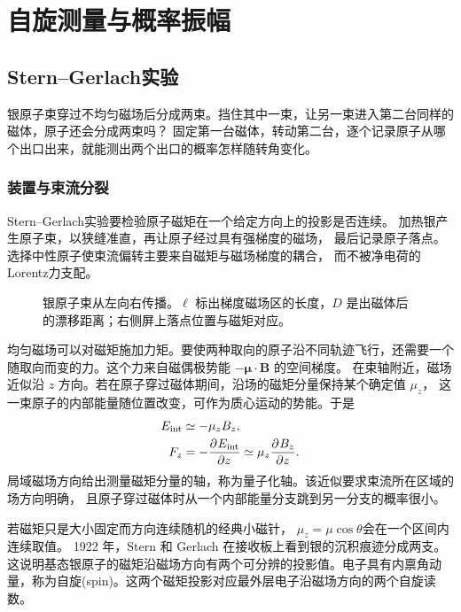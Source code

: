 \chapter{自旋测量与概率振幅}
\label{ch:spin}

\section{Stern--Gerlach实验}
银原子束穿过不均匀磁场后分成两束。挡住其中一束，让另一束进入第二台同样的磁体，原子还会分成两束吗？
固定第一台磁体，转动第二台，逐个记录原子从哪个出口出来，就能测出两个出口的概率怎样随转角变化。

\subsection{装置与束流分裂}
\label{ss:sg-apparatus}

Stern--Gerlach实验要检验原子磁矩在一个给定方向上的投影是否连续。
加热银产生原子束，以狭缝准直，再让原子经过具有强梯度的磁场，
最后记录原子落点。选择中性原子使束流偏转主要来自磁矩与磁场梯度的耦合，
而不被净电荷的Lorentz力支配\cite{sg}。

\begin{figure}[htbp]
    \centering
    \caption{银原子束从左向右传播。$\ell$ 标出梯度磁场区的长度，$D$ 是出磁体后的漂移距离；右侧屏上落点位置与磁矩对应。}
    \label{fig:sg-beam}
\end{figure}

均匀磁场可以对磁矩施加力矩。要使两种取向的原子沿不同轨迹飞行，还需要一个随取向而变的力。这个力来自磁偶极势能 $-\bm\mu \cdot \bm B$ 的空间梯度。
在束轴附近，磁场近似沿 $z$ 方向。若在原子穿过磁体期间，沿场的磁矩分量保持某个确定值 $\mu_z$，
这一束原子的内部能量随位置改变，可作为质心运动的势能。于是
\begin{subequations}
    \begin{align}
        E_{\mathrm{int}} &\simeq -\mu_z B_z,\\
        F_z &= -\frac{\partial^{}E_{\mathrm{int}}}{\partial{z}^{}} \simeq \mu_z\frac{\partial^{}B_z}{\partial{z}^{}}.
    \end{align}
\end{subequations}
局域磁场方向给出测量磁矩分量的轴，称为量子化轴。该近似要求束流所在区域的场方向明确，
且原子穿过磁体时从一个内部能量分支跳到另一分支的概率很小。

若磁矩只是大小固定而方向连续随机的经典小磁针，
$\mu_z = \mu\cos\theta$会在一个区间内连续取值。
1922 年，Stern 和 Gerlach 在接收板上看到银的沉积痕迹分成两支。这说明基态银原子的磁矩沿磁场方向有两个可分辨的投影值。电子具有内禀角动量，称为自旋(spin)。这两个磁矩投影对应最外层电子沿磁场方向的两个自旋读数。

